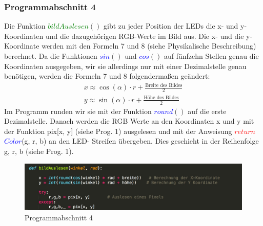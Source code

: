 \documentclass [a4paper, 11pt] {article}
\begin{document}
\subsubsection{Programmabschnitt 4}
Die Funktion \textcolor{green}{$bildAuslesen$}{$()$} gibt zu jeder Position der LEDs die x- und y-Koordinaten und die dazugehörigen RGB-Werte im Bild aus. Die x- und die y-Koordinate werden mit den Formeln 7 und 8 (siehe Physikalische Beschreibung) berechnet. Da die Funktionen \textcolor{blue}{$sin$}{$()$} und \textcolor{blue}{$cos$}{$()$} auf fünfzehn Stellen genau die Koordinaten ausgegeben, wir sie allerdings nur mit einer Dezimalstelle genau benötigen, werden die Formeln 7 und 8 folgendermaßen geändert:
\begin{align}
x \approx \cos (\alpha) \cdot r + \frac{\text{Breite \ des \ Bildes}}{2} \\
y \approx\sin (\alpha) \cdot r + \frac{\text{Höhe\ des\ Bildes}}{2}
\end{align}
Im Programm runden wir sie mit der Funktion \textcolor{blue}{$round$}{$()$} auf die erste Dezimalstelle. Danach werden die RGB Werte an den Koordinaten x und y mit der Funktion pix[x, y] (siehe Prog. 1) ausgelesen und mit der Anweisung \textcolor{red}{$return$} \textcolor{blue}{$Color$}(g, r, b) an den LED- Streifen übergeben. Dies geschieht in der Reihenfolge g, r, b (siehe Prog. 1).
\begin{figure}[h]
	\centering
	\includegraphics[width=16cm]{P4.png}
	\caption{Programmabschnitt 4}
\end{figure}
\end{document}
